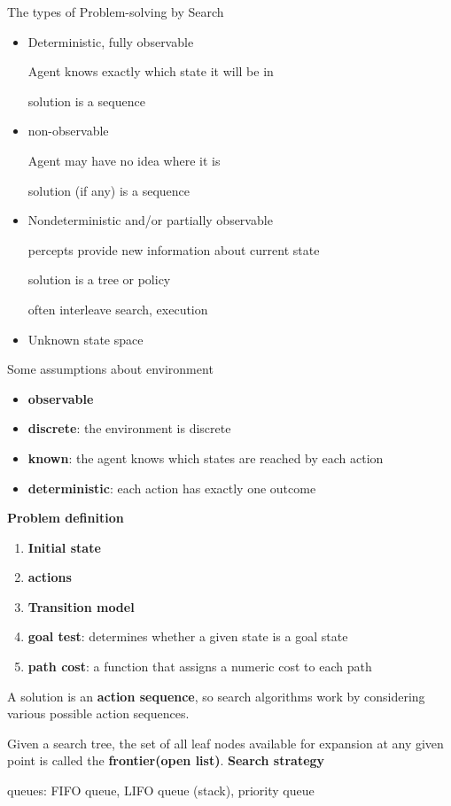 \documentclass[11pt]{article}
\begin{document}
The types of Problem-solving by Search
\begin{itemize}
\item Deterministic, fully observable

Agent knows exactly which state it will be in

solution is a sequence
\item non-observable

Agent may have no idea where it is

solution (if any) is a sequence
\item Nondeterministic and/or partially observable

percepts provide new information about current state

solution is a tree or policy

often interleave search, execution
\item Unknown state space
\end{itemize}


Some assumptions about environment
\begin{itemize}
\item \textbf{observable}
\item \textbf{discrete}: the environment is discrete
\item \textbf{known}: the agent knows which states are reached by each action
\item \textbf{deterministic}: each action has exactly one outcome
\end{itemize}


\textbf{Problem definition}
\begin{enumerate}
\item \textbf{Initial state}
\item \textbf{actions}
\item \textbf{Transition model}
\item \textbf{goal test}: determines whether a given state is a goal state
\item \textbf{path cost}: a function that assigns a numeric cost to each path
\end{enumerate}


A solution is an \textbf{action sequence}, so search algorithms work
by considering various possible action sequences.


Given a search tree, the set of all leaf nodes available for expansion at any
given point is called the \textbf{frontier(open list)}. \textbf{Search strategy}


queues: FIFO queue, LIFO queue (stack), priority queue
\end{document}
